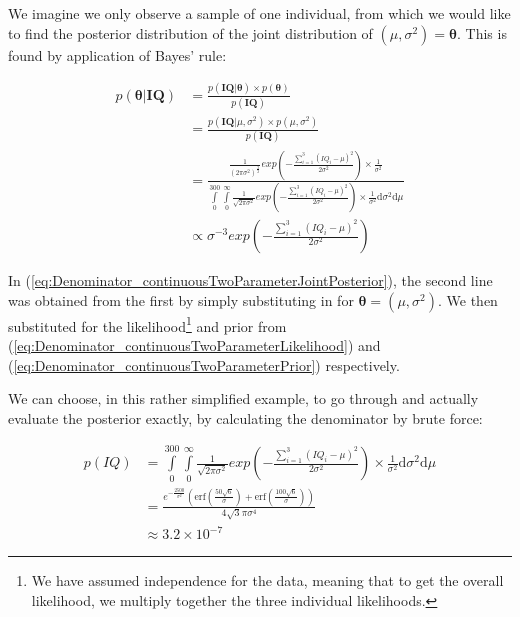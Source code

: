 \documentclass[11pt,fullpage]{book}
\begin{document}
We imagine we only observe a sample of one individual, from which we would like to find the posterior distribution of the joint distribution of $(\mu,\sigma^2)=\boldsymbol{\theta}$. This is found by application of Bayes' rule:

\begin{equation}\label{eq:Denominator_continuousTwoParameterJointPosterior}
\begin{align}
p(\boldsymbol{\theta}|\boldsymbol{IQ}) &= \frac{p(\boldsymbol{IQ}|\boldsymbol{\theta})\times p(\boldsymbol{\theta})}{p(\boldsymbol{IQ})}\\
&= \frac{p(\boldsymbol{IQ}|\mu,\sigma^2)\times p(\mu,\sigma^2)}{p(\boldsymbol{IQ})}\\
&= \frac{\frac{1}{(2\pi\sigma^2)^\frac{3}{2}} exp\left(-\frac{\sum\limits_{i=1}^{3}(IQ_i-\mu)^2}{2\sigma^2}\right)\times\frac{1}{\sigma^2}}{\int\limits_{0}^{300}\int\limits_{0}^{\infty}\frac{1}{\sqrt{2\pi\sigma^2}} exp\left(-\frac{\sum\limits_{i=1}^{3}(IQ_i-\mu)^2}{2\sigma^2}\right)\times\frac{1}{\sigma^2}\mathrm{d}\sigma^2\mathrm{d}\mu}\\
&\propto \sigma^{-3} exp\left(-\frac{\sum\limits_{i=1}^{3}(IQ_i-\mu)^2}{2\sigma^2}\right)
\end{align}
\end{equation} 

In (\ref{eq:Denominator_continuousTwoParameterJointPosterior}), the second line was obtained from the first by simply substituting in for $\boldsymbol{\theta}=(\mu,\sigma^2)$. We then substituted for the likelihood\footnote{We have assumed independence for the data, meaning that to get the overall likelihood, we multiply together the three individual likelihoods.} and prior from (\ref{eq:Denominator_continuousTwoParameterLikelihood}) and (\ref{eq:Denominator_continuousTwoParameterPrior}) respectively. 

We can choose, in this rather simplified example, to go through and actually evaluate the posterior exactly, by calculating the denominator by brute force:

\begin{equation}
\begin{align}
p(IQ)&=\int\limits_{0}^{300}\int\limits_{0}^{\infty}\frac{1}{\sqrt{2\pi\sigma^2}} exp\left(-\frac{\sum\limits_{i=1}^{3}(IQ_i-\mu)^2}{2\sigma^2}\right)\times\frac{1}{\sigma^2}\mathrm{d}\sigma^2\mathrm{d}\mu\\
&= \frac{e^{-\frac{2500}{\sigma ^2}} \left(\text{erf}\left(\frac{50 \sqrt{6}}{\sigma }\right)+\text{erf}\left(\frac{100 \sqrt{6}}{\sigma }\right)\right)}{4
   \sqrt{3} \pi  \sigma ^4}\\
&\approx 3.2\times 10^{-7}
\end{align}
\end{equation}
\end{document}
